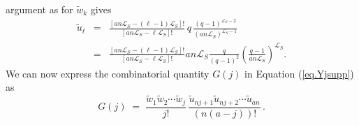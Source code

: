 \documentclass[journal=mamobx,manuscript=article]{achemso}
\newcommand{\leng}{\mathcal{L}}
\begin{document}
argument as for $\tilde{w}_k$ gives
\begin{eqnarray}
   \tilde{u}_{\ell}  
 & = &    \frac{[an\leng_S-(\ell-1)\leng_S]!}{[an\leng_S-\ell \leng_S]!} \,q\,  \frac{(q-1)^{\leng_S-2}}{(an\leng_S)^{\leng_S-1}}  
     \nonumber    \\
     & = &    \frac{[an\leng_S-(\ell-1)\leng_S]!}{[an\leng_S-\ell \leng_S]!}   an\leng_S \frac{q}{(q-1)^2}\left(  \frac{q-1}{an\leng_S}\right)^{\leng_S}.
     \label{eq.uell2}
\end{eqnarray}
We can now express the combinatorial quantity $G(j)$ 
in Equation (\ref{eq.Yjsupp}) as
\begin{equation}
    \label{eq.Gformula}
      G(j) \;=\;      \frac{\tilde{w}_1\tilde{w}_2\cdots \tilde{w}_j}{j!}
                    \,   \frac{\tilde{u}_{nj+1}\tilde{u}_{nj+2}\cdots \tilde{u}_{an}}{(n(a-j))!}  \,.
\end{equation}



\end{document}
